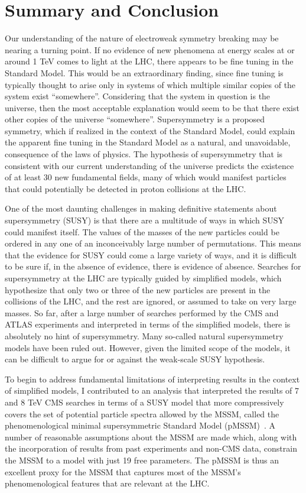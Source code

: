 \FloatBarrier
\chapter{Summary and Conclusion}
Our understanding of the nature of electroweak symmetry breaking may be nearing a turning point. If no evidence of new phenomena at energy scales at or around 1 TeV comes to light at the LHC, there appears to be fine tuning in the Standard Model. This would be an extraordinary finding, since fine tuning is typically thought to arise only in systems of which multiple similar copies of the system exist ``somewhere''. Considering that the system in question is the universe, then the most acceptable explanation would seem to be that there exist other copies of the universe ``somewhere''. Supersymmetry is a proposed symmetry, which if realized in the context of the Standard Model, could explain the apparent fine tuning in the Standard Model as a natural, and unavoidable, consequence of the laws of physics. The hypothesis of supersymmetry that is consistent with our current understanding of the universe predicts the existence of at least 30 new fundamental fields, many of which would manifest particles that could potentially be detected in proton collisions at the LHC. 

One of the most daunting challenges in making definitive statements about supersymmetry (SUSY) is that there are a multitude of ways in which SUSY could manifest itself. The values of the masses of the new particles could be ordered in any one of an inconceivably large number of permutations. This means that the evidence for SUSY could come a large variety of ways, and it is difficult to be sure if, in the absence of evidence, there is evidence of absence. Searches for supersymmetry at the LHC are typically guided by simplified models, which hypothesize that only two or three of the new particles are present in the collisions of the LHC, and the rest are ignored, or assumed to take on very large masses. So far, after a large number of searches performed by the CMS and ATLAS experiments and interpreted in terms of the simplified models, there is absolutely no hint of supersymmetry. Many so-called natural supersymmetry models have been ruled out. However, given the limited scope of the models, it can be difficult to argue for or against the weak-scale SUSY hypothesis.

To begin to address fundamental limitations of interpreting results in the context of simplified models, I contributed to an analysis that interpreted the results of 7 and 8 TeV CMS searches in terms of a SUSY model that more compressively covers the set of potential particle spectra allowed by the MSSM, called the phenomenological minimal supersymmetric Standard Model (pMSSM)~\cite{bib:Us!}. A number of reasonable assumptions about the MSSM are made which, along with the incorporation of results from past experiments and non-CMS data, constrain the MSSM to a model with just 19 free parameters. The pMSSM is thus an excellent proxy for the MSSM that captures most of the MSSM's phenomenological features that are relevant at the LHC. 

